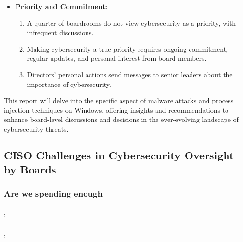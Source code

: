 \documentclass{article}
\begin{document}
\begin{itemize}
  \item \textbf{Priority and Commitment:}
        \begin{enumerate}
          \item A quarter of boardrooms do not view cybersecurity as a priority, with infrequent discussions.
          \item Making cybersecurity a true priority requires ongoing commitment, regular updates, and personal interest from board members.
          \item Directors' personal actions send messages to senior leaders about the importance of cybersecurity.
        \end{enumerate}
\end{itemize}

This report will delve into the specific aspect of malware attacks and process injection techniques on Windows, offering insights and recommendations to enhance board-level discussions and decisions in the ever-evolving landscape of cybersecurity threats.

\subsection{CISO Challenges in Cybersecurity Oversight by Boards}

\subsubsection{Are we spending enough}

\subsubsection{\textcite{FBI:2023}}
\textbf{}: 


\subsubsection{\textcite{Hiscox:2022}}
\textbf{}: 




\end{document}
